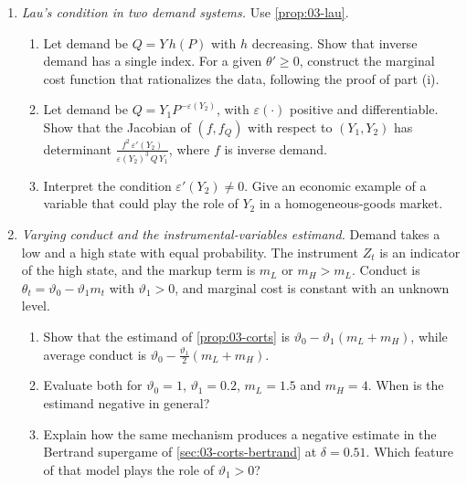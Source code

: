 \begin{enumerate}[label=\arabic*., leftmargin=*, itemsep=6pt]
\item \textit{Lau's condition in two demand systems.} Use \cref{prop:03-lau}.
\begin{enumerate}[label=(\alph*)]
  \item Let demand be $Q = Y\,h(P)$ with $h$ decreasing. Show that inverse demand has a single index. For a given
  $\theta' \ge 0$, construct the marginal cost function that rationalizes the data, following the proof of part (i).
  \item Let demand be $Q = Y_1 P^{-\varepsilon(Y_2)}$, with $\varepsilon(\cdot)$ positive and differentiable. Show that
  the Jacobian of $(f, f_Q)$ with respect to $(Y_1, Y_2)$ has determinant
  $\frac{f^2\,\varepsilon'(Y_2)}{\varepsilon(Y_2)^3\, Q\, Y_1}$, where $f$ is inverse demand.
  \item Interpret the condition $\varepsilon'(Y_2) \ne 0$. Give an economic example of a variable that could play the
  role of $Y_2$ in a homogeneous-goods market.
\end{enumerate}

\item \textit{Varying conduct and the instrumental-variables estimand.} Demand takes a low and a high state with equal
probability. The instrument $Z_t$ is an indicator of the high state, and the markup term is $m_L$ or $m_H > m_L$.
Conduct is $\theta_t = \vartheta_0 - \vartheta_1 m_t$ with $\vartheta_1 > 0$, and marginal cost is constant with an
unknown level.
\begin{enumerate}[label=(\alph*)]
  \item Show that the estimand of \cref{prop:03-corts} is $\vartheta_0 - \vartheta_1(m_L + m_H)$, while average conduct
  is $\vartheta_0 - \frac{\vartheta_1}{2}(m_L + m_H)$.
  \item Evaluate both for $\vartheta_0 = 1$, $\vartheta_1 = 0.2$, $m_L = 1.5$ and $m_H = 4$. When is the estimand
  negative in general?
  \item Explain how the same mechanism produces a negative estimate in the Bertrand supergame of
  \cref{sec:03-corts-bertrand} at $\delta = 0.51$. Which feature of that model plays the role of $\vartheta_1 > 0$?
\end{enumerate}


\end{enumerate}
